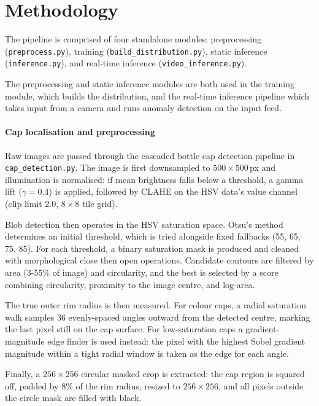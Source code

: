 \documentclass[conference]{IEEEtran}
\begin{document}

\section{Methodology}

The pipeline is comprised of four standalone modules: preprocessing (\texttt{preprocess.py}), training (\texttt{build\_distribution.py}), static inference (\texttt{inference.py}), and real-time inference (\texttt{video\_inference.py}).

The preprocessing and static inference modules are both used in the training module, which builds the distribution, and the real-time inference pipeline which takes input from a camera and runs anomaly detection on the input feed.

\paragraph{Cap localisation and preprocessing}
Raw images are passed through the cascaded bottle cap detection pipeline in \texttt{cap\_detection.py}. The image is first downsampled to $500\times500$\,px and illumination is normalised: if mean brightness falls below a threshold, a gamma lift ($\gamma=0.4$) is applied, followed by CLAHE on the HSV data's value channel (clip limit 2.0, $8\times8$ tile grid).

Blob detection then operates in the HSV saturation space. Otsu's method determines an initial threshold, which is tried alongside fixed fallbacks (55, 65, 75, 85). For each threshold, a binary saturation mask is produced and cleaned with morphological close then open operations. Candidate contours are filtered by area (3-55\% of image) and circularity, and the best is selected by a score combining circularity, proximity to the image centre, and log-area.

The true outer rim radius is then measured. For colour caps, a radial saturation walk samples 36 evenly-spaced angles outward from the detected centre, marking the last pixel still on the cap surface. For low-saturation caps a gradient-magnitude edge finder is used instead: the pixel with the highest Sobel gradient magnitude within a tight radial window is taken as the edge for each angle.

Finally, a $256\times256$ circular masked crop is extracted: the cap region is squared off, padded by 8\% of the rim radius, resized to $256\times256$, and all pixels outside the circle mask are filled with black.
\end{document}
